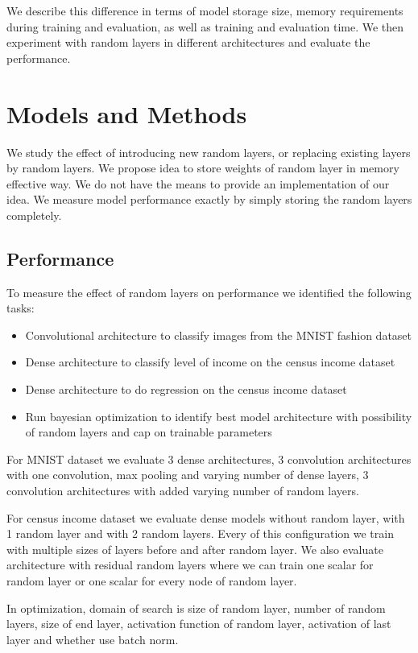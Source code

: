 \documentclass[]{article}
\begin{document}
\begin{multicols}{2}
	We describe this difference in terms of model storage size, memory requirements during training and evaluation, as well as training and evaluation time. We then experiment with random layers in different architectures and evaluate the performance.
	
	\section{Models and Methods}
	We study the effect of introducing new random layers, or replacing existing layers by random layers. We propose idea to store weights of random layer in memory effective way. We do not have the means to provide an implementation of our idea. We measure model performance exactly by simply storing the random layers completely.
	
	
	\subsection{Performance}
	To measure the effect of random layers on performance we identified the following tasks:
	\begin{itemize}
		\itemsep0em
		\item Convolutional architecture to classify images from the MNIST fashion dataset
		\item Dense architecture to classify level of income on the census income dataset
		\item Dense architecture to do regression on the census income dataset
		\item Run bayesian optimization to identify best model architecture with possibility of random layers and cap on trainable parameters
	\end{itemize}
	For MNIST dataset we evaluate 3 dense architectures, 3 convolution architectures with one convolution, max pooling and varying number of dense layers, 3 convolution architectures with added varying number of random layers.

	For census income dataset we evaluate dense models without random layer, with 1 random layer and with 2 random layers. Every of this configuration we train with multiple sizes of layers before and after random layer. We also evaluate architecture with residual random layers where we can train one scalar for random layer or one scalar for every node of random layer.
	
	In optimization, domain of search is size of random layer, number of random layers, size of end layer, activation function of random layer, activation of last layer and whether use batch norm.	
	

\end{multicols}
\end{document}
